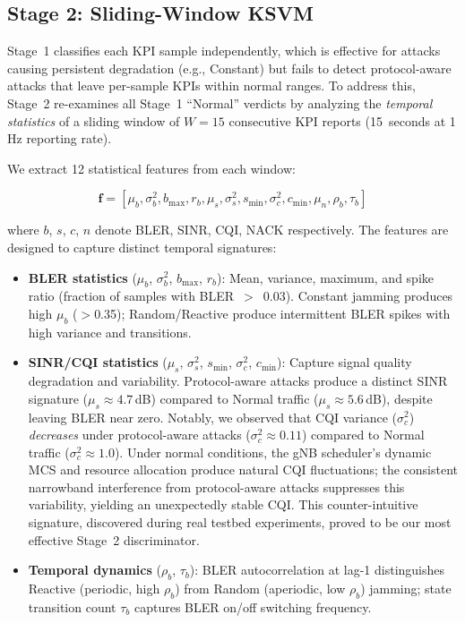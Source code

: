 \documentclass[conference]{IEEEtran}
\begin{document}
\subsection{Stage 2: Sliding-Window KSVM}

Stage~1 classifies each KPI sample independently, which is effective for attacks causing persistent degradation (e.g., Constant) but fails to detect protocol-aware attacks that leave per-sample KPIs within normal ranges. To address this, Stage~2 re-examines all Stage~1 ``Normal'' verdicts by analyzing the \textit{temporal statistics} of a sliding window of $W=15$ consecutive KPI reports (15~seconds at 1\,Hz reporting rate).

We extract 12 statistical features from each window:

\begin{equation}
\mathbf{f} = [\mu_b, \sigma^2_b, b_{\max}, r_b, \mu_s, \sigma^2_s, s_{\min}, \sigma^2_c, c_{\min}, \mu_n, \rho_b, \tau_b]
\end{equation}

\noindent where $b$, $s$, $c$, $n$ denote BLER, SINR, CQI, NACK respectively. The features are designed to capture distinct temporal signatures:

\begin{itemize}
    \item \textbf{BLER statistics} ($\mu_b$, $\sigma^2_b$, $b_{\max}$, $r_b$): Mean, variance, maximum, and spike ratio (fraction of samples with BLER~$>$~0.03). Constant jamming produces high $\mu_b$ ($>$0.35); Random/Reactive produce intermittent BLER spikes with high variance and transitions.
    \item \textbf{SINR/CQI statistics} ($\mu_s$, $\sigma^2_s$, $s_{\min}$, $\sigma^2_c$, $c_{\min}$): Capture signal quality degradation and variability. Protocol-aware attacks produce a distinct SINR signature ($\mu_s \approx 4.7$\,dB) compared to Normal traffic ($\mu_s \approx 5.6$\,dB), despite leaving BLER near zero. Notably, we observed that CQI variance ($\sigma^2_c$) \textit{decreases} under protocol-aware attacks ($\sigma^2_c \approx 0.11$) compared to Normal traffic ($\sigma^2_c \approx 1.0$). Under normal conditions, the gNB scheduler's dynamic MCS and resource allocation produce natural CQI fluctuations; the consistent narrowband interference from protocol-aware attacks suppresses this variability, yielding an unexpectedly stable CQI. This counter-intuitive signature, discovered during real testbed experiments, proved to be our most effective Stage~2 discriminator.
    \item \textbf{Temporal dynamics} ($\rho_b$, $\tau_b$): BLER autocorrelation at lag-1 distinguishes Reactive (periodic, high $\rho_b$) from Random (aperiodic, low $\rho_b$) jamming; state transition count $\tau_b$ captures BLER on/off switching frequency.
\end{itemize}
\end{document}
